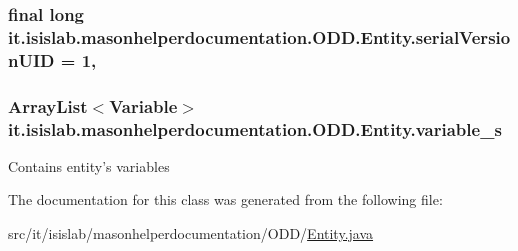 \hypertarget{classit_1_1isislab_1_1masonhelperdocumentation_1_1_o_d_d_1_1_entity_a5bf947b1ed7e18b5b727b2699f4df3cd}{
\subsubsection[{serial\-Version\-U\-I\-D}]{\setlength{\rightskip}{0pt plus 5cm}final long it.\-isislab.\-masonhelperdocumentation.\-O\-D\-D.\-Entity.\-serial\-Version\-U\-I\-D = 1\hspace{0.3cm}{\ttfamily [static]}, {\ttfamily [private]}}}\label{classit_1_1isislab_1_1masonhelperdocumentation_1_1_o_d_d_1_1_entity_a5bf947b1ed7e18b5b727b2699f4df3cd}
\hypertarget{classit_1_1isislab_1_1masonhelperdocumentation_1_1_o_d_d_1_1_entity_a32a30da644c3d9ef1a3d04b6b5b8346f}{
\subsubsection[{variable\-\_\-s}]{\setlength{\rightskip}{0pt plus 5cm}Array\-List$<${\bf Variable}$>$ it.\-isislab.\-masonhelperdocumentation.\-O\-D\-D.\-Entity.\-variable\-\_\-s\hspace{0.3cm}{\ttfamily [private]}}}\label{classit_1_1isislab_1_1masonhelperdocumentation_1_1_o_d_d_1_1_entity_a32a30da644c3d9ef1a3d04b6b5b8346f}
Contains entity's variables 

The documentation for this class was generated from the following file\-:\begin{DoxyCompactItemize}
\item 
src/it/isislab/masonhelperdocumentation/\-O\-D\-D/\hyperlink{_entity_8java}{Entity.\-java}\end{DoxyCompactItemize}
